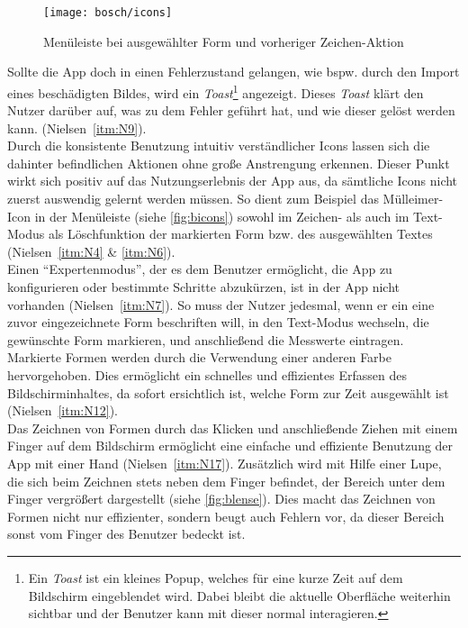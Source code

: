 \begin{figure}[h]
  \centering
  \texttt{[image: bosch/icons]}
  \caption{Menüleiste bei ausgewählter Form und vorheriger Zeichen-Aktion}
  \label{fig:bicons}
\end{figure}

Sollte die App doch in einen Fehlerzustand gelangen, wie bspw. durch den Import eines beschädigten Bildes, wird ein \emph{Toast}\footnote{Ein \emph{Toast} ist ein kleines Popup, welches für eine kurze Zeit auf dem Bildschirm eingeblendet wird. Dabei bleibt die aktuelle Oberfläche weiterhin sichtbar und der Benutzer kann mit dieser normal interagieren.} angezeigt.
Dieses \emph{Toast} klärt den Nutzer darüber auf, was zu dem Fehler geführt hat, und wie dieser gelöst werden kann.
 (Nielsen~\autoref{itm:N9}). \\

Durch die konsistente Benutzung intuitiv verständlicher Icons lassen sich die dahinter befindlichen Aktionen ohne große Anstrengung erkennen.
Dieser Punkt wirkt sich positiv auf das Nutzungserlebnis der App aus, da sämtliche Icons nicht zuerst auswendig gelernt werden müssen.
So dient zum Beispiel das Mülleimer-Icon in der Menüleiste (siehe \autoref{fig:bicons}) sowohl im Zeichen- als auch im Text-Modus als Löschfunktion der markierten Form bzw. des ausgewählten Textes (Nielsen~\autoref{itm:N4} \& \autoref{itm:N6}). \\

Einen ``Expertenmodus'', der es dem Benutzer ermöglicht, die App zu konfigurieren oder bestimmte Schritte abzukürzen, ist in der App nicht vorhanden (Nielsen~\autoref{itm:N7}).
So muss der Nutzer jedesmal, wenn er ein eine zuvor eingezeichnete Form beschriften will, in den Text-Modus wechseln, die gewünschte Form markieren, und anschließend die Messwerte eintragen.  \\

Markierte Formen werden durch die Verwendung einer anderen Farbe hervorgehoben.
Dies ermöglicht ein schnelles und effizientes Erfassen des Bildschirminhaltes, da sofort ersichtlich ist, welche Form zur Zeit ausgewählt ist (Nielsen~\autoref{itm:N12}). \\ 

Das Zeichnen von Formen durch das Klicken und anschließende Ziehen mit einem Finger auf dem Bildschirm ermöglicht eine einfache und effiziente Benutzung der App mit einer Hand (Nielsen~\autoref{itm:N17}).
Zusätzlich wird mit Hilfe einer Lupe, die sich beim Zeichnen stets neben dem Finger befindet, der Bereich unter dem Finger vergrößert dargestellt (siehe \autoref{fig:blense}).
Dies macht das Zeichnen von Formen nicht nur effizienter, sondern beugt auch Fehlern vor, da dieser Bereich sonst vom Finger des Benutzer bedeckt ist. \\

